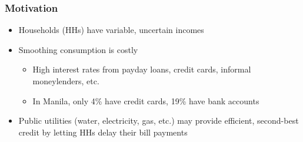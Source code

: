 \documentclass[aspectratio=149]{beamer}
\begin{document}
\begin{frame}
\frametitle{ Motivation }


\begin{itemize}
\item Households (HHs) have variable, uncertain incomes
\vspace{2mm}
\item Smoothing consumption is costly 
  \begin{itemize}
    \item High interest rates from payday loans, credit cards, informal moneylenders, etc.
    \item In Manila, only 4\% have credit cards, 19\% have bank accounts
  \end{itemize}

\vspace{2mm}

\item Public utilities (water, electricity, gas, etc.) may provide efficient, second-best credit by letting HHs delay their bill payments
  \vspace{1mm}

\end{itemize}

\end{frame}

\end{document}
